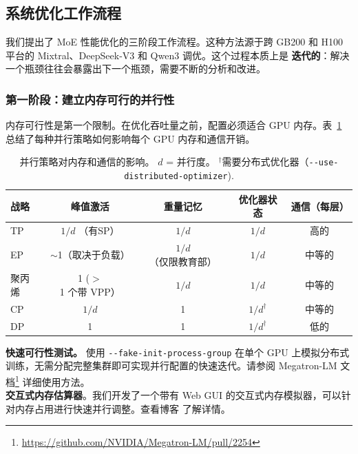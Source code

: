 \subsection{系统优化工作流程}\label{sec:best-practices-methodology}

我们提出了 MoE 性能优化的三阶段工作流程。这种方法源于跨 GB200 和 H100 平台的 Mixtral、DeepSeek-V3 和 Qwen3 调优。这个过程本质上是 \textbf{迭代的}：解决一个瓶颈往往会暴露出下一个瓶颈，需要不断的分析和改进。

\subsubsection{第一阶段：建立内存可行的并行性}

内存可行性是第一个限制。在优化吞吐量之前，配置必须适合 GPU 内存。表~\ref{tab:parallel-memory-impact} 总结了每种并行策略如何影响每个 GPU 内存和通信开销。

\begin{table}[ht]
\centering
\caption{并行策略对内存和通信的影响。 $d$ = 并行度。 $^\dagger$需要分布式优化器（\texttt{-{}-use-distributed-optimizer}).}
\label{tab:parallel-memory-impact}
\begin{tabular}{lcccc}
\toprule
\textbf{战略} & \textbf{峰值激活} & \textbf{重量记忆} & \textbf{优化器状态} & \textbf{通信（每层）} \\
\midrule
TP & $1/d$ （有SP） & $1/d$ & $1/d$ & 高的 \\
EP & $\sim$1（取决于负载） & $1/d$ （仅限教育部） & $1/d$ & 中等的 \\
聚丙烯 & 1 ($>$1 个带 VPP） & $1/d$ & $1/d$ & 中等的 \\
CP & $1/d$ & 1 & $1/d^\dagger$ & 中等的 \\
DP & 1 & 1 & $1/d^\dagger$ & 低的 \\
\bottomrule
\end{tabular}
\end{table}

\begin{notebox}
\textbf{快速可行性测试。} 使用 \texttt{-{}-fake-init-process-group} 在单个 GPU 上模拟分布式训练，无需分配完整集群即可实现并行配置的快速迭代。请参阅 Megatron-LM 文档\footnote{\url{https://github.com/NVIDIA/Megatron-LM/pull/2254}} 详细使用方法。\\
\textbf{交互式内存估算器}。我们开发了一个带有 Web GUI 的交互式内存模拟器，可以针对内存占用进行快速并行调整。查看博客\cite{nvidia_memory_estimator_blog} 了解详情。

\end{notebox}

